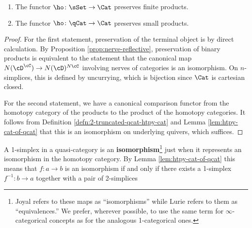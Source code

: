 \begin{lemma}\label{lem:ho-preserves-products}
  $\quad$
  \begin{enumerate}
  \item The functor $\ho \colon \sSet \to \Cat$ preserves finite products.
  \item The functor $\ho \colon \qCat \to \Cat$ preserves small products.
  \end{enumerate}
\end{lemma}
\begin{proof}
  For the first statement, preservation of the terminal object is by direct calculation. By Proposition \ref{prop:nerve-reflective}, preservation of binary products is equivalent to the statement that the canonical map $N(\cD^\cC) \to N(\cD)^{N\cC}$ involving nerves of categories is an isomorphism. On $n$-simplices, this is defined by uncurrying, which is bijection since $\Cat$ is cartesian closed.

  For the second statement, we have a canonical comparison functor from the homotopy category of the products to the product of the homotopy categories. It follows from Definition \ref{defn:2-truncated-qcat-htpy-cat} and Lemma \ref{lem:htpy-cat-of-qcat} that this is an isomorphism on underlying quivers, which suffices.
\end{proof}



   \begin{definition}\label{defn:isomorphism}
     A 1-simplex in a quasi-category is an \textbf{isomorphism}\footnote{Joyal refers to these maps as ``isomorphisms'' while Lurie refers to them as ``equivalences.'' We prefer, wherever possible, to use the same term for $\infty$-categorical concepts as for the analogous 1-categorical ones.} just when it represents an isomorphism in the homotopy category. By Lemma \ref{lem:htpy-cat-of-qcat} this means that $f \colon a \to b$ is an isomorphism if and only if there exists a 1-simplex $f^{-1} \colon b \to a$ together with a pair of 2-simplices
   \begin{center}
   \end{center}
   \end{definition}

